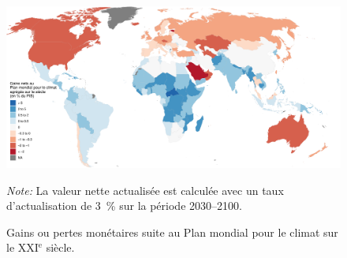 \documentclass[a5paper,french,openany]{memoir}
\begin{document}
\begin{figure}
  \caption[Gains nets par pays sur le XXI$^\text{e}$ siècle]{Gains ou pertes monétaires suite au Plan mondial pour le climat sur le XXI$^\text{e}$ siècle.}\label{fig:gain_npv}
  \centerline{\includegraphics[width=.9\paperheight]{../figures/maps/npv_over_gdp_gcs_adj_fr.pdf}
    } %
  {\footnotesize \textit{Note:} La valeur nette actualisée est calculée avec un taux d'actualisation de 3~\% sur la période 2030--2100.}
\end{figure}
\end{document}
